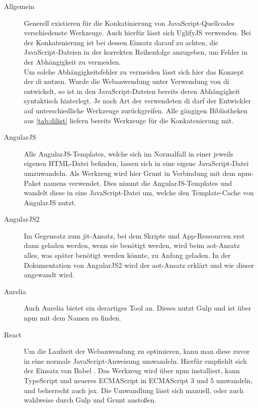 \begin{description}
	\item[Allgemein] Generell existieren für die Konkatinierung von JavaScript-Quellcodes verschiedenste Werkzeuge. Auch hierfür lässt sich UglifyJS verwenden. Bei der Konkatenierung ist bei dessen Einsatz darauf zu achten, die JavaScript-Dateien in der korrekten Reihenfolge anzugeben, um Fehler in der Abhängigkeit zu vermeiden. \\
	Um solche Abhängigkeitsfehler zu vermeiden lässt sich hier das Konzept der \ac{di} nutzen. Wurde die Webanwendung unter Verwendung von \ac{di} entwickelt, so ist in den JavaScript-Dateien bereits deren Abhängigkeit syntaktisch hinterlegt. Je nach Art der verwendeten \ac{di} darf der Entwickler auf unterschiedliche Werkzeuge zurückgreifen. Alle gängigen Bibliotheken aus \autoref{tab:dilist} liefern bereits Werkzeuge für die Konkatenierung mit.
	
	\item[AngularJS] Alle AngularJS-Templates, welche sich im Normalfall in einer jeweils eigenen HTML-Datei befinden, lassen sich in eine eigene JavaScript-Datei umzuwandeln. Als Werkzeug wird hier Grunt in Verbindung mit dem \ac{npm}-Paket namens  \cite{Clemmons2016} verwendet. Dies nimmt die AngularJS-Templates und wandelt diese in eine JavaScript-Datei um, welche den Template-Cache \cite{Google2016c} von AngularJS nutzt.
	
	\item[AngularJS2] Im Gegensatz zum \ac{jit}-Ansatz, bei dem Skripte und App-Ressourcen erst dann geladen werden, wenn sie benötigt werden, wird beim \ac{aot}-Ansatz alles, was später benötigt werden könnte, zu Anfang geladen.  In der Dokumentation von AngularJS2 wird der \ac{aot}-Ansatz erklärt \cite{Google2016a} und wie dieser angewandt wird.
	
	\item[Aurelia] Auch Aurelia bietet ein derartiges Tool an. Dieses nutzt Gulp und ist über \ac{npm} mit dem Namen  \cite{Aurelia2016} zu finden.
	
	\item[React] Um die Laufzeit der Webanwendung zu optimieren, kann man diese zuvor in eine normale JavaScript-Anweisung umwandeln. Hierfür empfiehlt sich der Einsatz von Babel \cite{Babel2016}. Das Werkzeug wird über \ac{npm} installiert, kann TypeScript und neueres ECMAScript in ECMAScript 3 und 5 umwandeln, und beherrscht auch \ac{jsx}. Die Umwandlung lässt sich manuell, oder auch wahlweise durch Gulp und Grunt anstoßen.
	
	
	
\end{description}